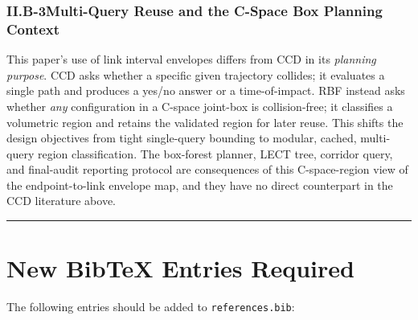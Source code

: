 \documentclass[11pt,a4paper]{article}
\newcommand{\rbf}{\textsc{RBF}}
\begin{document}
\subsubsection*{II.B-3\quad Multi-Query Reuse and the C-Space Box Planning Context}

This paper's use of link interval envelopes differs from CCD in its \emph{planning
purpose}.  CCD asks whether a specific given trajectory collides; it evaluates
a single path and produces a yes/no answer or a time-of-impact.  \rbf{} instead
asks whether \emph{any} configuration in a C-space joint-box is collision-free;
it classifies a volumetric region and retains the validated region for later
reuse.  This shifts the design objectives from tight single-query bounding to
modular, cached, multi-query region classification.  The box-forest planner,
LECT tree, corridor query, and final-audit reporting protocol are consequences
of this C-space-region view of the endpoint-to-link envelope map, and they have
no direct counterpart in the CCD literature above.

\bigskip
\hrule
\bigskip

\section{New BibTeX Entries Required}
\label{sec:new_bibtex}

The following entries should be added to \texttt{references.bib}:
\end{document}
